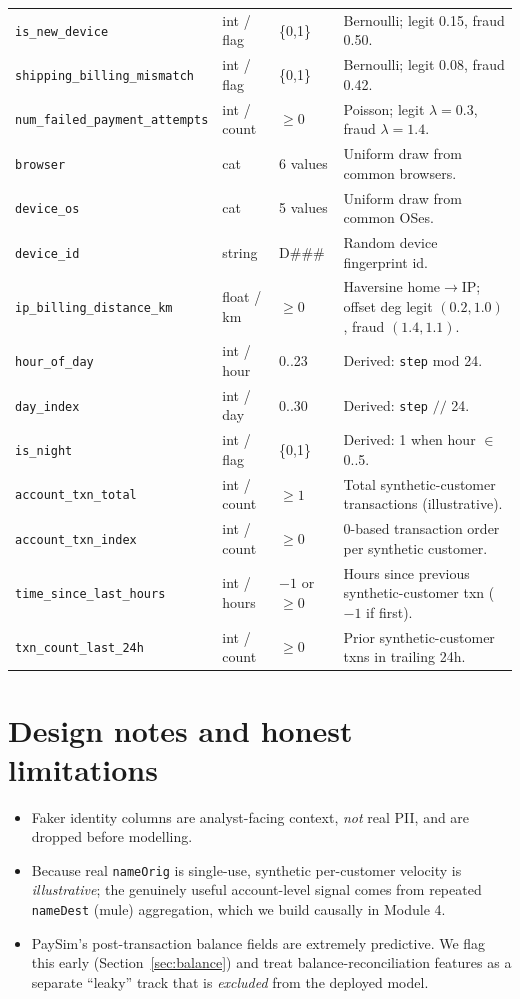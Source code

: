 \documentclass[11pt,a4paper]{report}
\newcommand{\code}[1]{\texttt{\small #1}}
\begin{document}
{\begin{longtable}{@{}p{4.6cm} p{1.6cm} p{2.3cm} p{6.3cm}@{}}
\texttt{is\_new\_device} & int / flag & \{0,1\} & Bernoulli; legit 0.15, fraud 0.50.\\
\texttt{shipping\_billing\_mismatch} & int / flag & \{0,1\} & Bernoulli; legit 0.08, fraud 0.42.\\
\texttt{num\_failed\_payment\_attempts} & int / count & $\ge 0$ & Poisson; legit $\lambda{=}0.3$, fraud $\lambda{=}1.4$.\\
\texttt{browser} & cat & 6 values & Uniform draw from common browsers.\\
\texttt{device\_os} & cat & 5 values & Uniform draw from common OSes.\\
\texttt{device\_id} & string & D\#\#\# & Random device fingerprint id.\\
\texttt{ip\_billing\_distance\_km} & float / km & $\ge 0$ & Haversine home$\to$IP; offset deg legit $(0.2,1.0)$, fraud $(1.4,1.1)$.\\
\texttt{hour\_of\_day} & int / hour & 0..23 & Derived: \texttt{step} mod 24.\\
\texttt{day\_index} & int / day & 0..30 & Derived: \texttt{step} $//$ 24.\\
\texttt{is\_night} & int / flag & \{0,1\} & Derived: 1 when hour $\in$ 0..5.\\
\texttt{account\_txn\_total} & int / count & $\ge 1$ & Total synthetic-customer transactions (illustrative).\\
\texttt{account\_txn\_index} & int / count & $\ge 0$ & 0-based transaction order per synthetic customer.\\
\texttt{time\_since\_last\_hours} & int / hours & $-1$ or $\ge 0$ & Hours since previous synthetic-customer txn ($-1$ if first).\\
\texttt{txn\_count\_last\_24h} & int / count & $\ge 0$ & Prior synthetic-customer txns in trailing 24h.\\
\end{longtable}}

\section{Design notes and honest limitations}

\begin{itemize}[nosep,leftmargin=1.4em]
  \item Faker identity columns are analyst-facing context, \emph{not} real PII, and are
        dropped before modelling.
  \item Because real \code{nameOrig} is single-use, synthetic per-customer velocity is
        \emph{illustrative}; the genuinely useful account-level signal comes from repeated
        \code{nameDest} (mule) aggregation, which we build causally in Module 4.
  \item PaySim's post-transaction balance fields are extremely predictive. We flag this
        early (Section~\ref{sec:balance}) and treat balance-reconciliation features as a
        separate ``leaky'' track that is \emph{excluded} from the deployed model.
\end{itemize}
\end{document}
